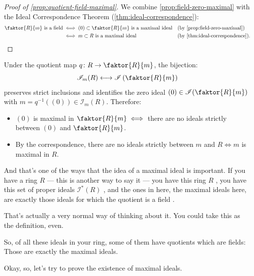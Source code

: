 \begin{content}
\begin{proof}[Proof of \cref{prop:quotient-field-maximal}]
We combine \cref{prop:field-zero-maximal} with the Ideal Correspondence Theorem (\cref{thm:ideal-correspondence}):
\begin{align*}
\faktor{R}{m} \text{ is a field} &\iff (0) \subset \faktor{R}{m} \text{ is a maximal ideal} && (\text{by \cref{prop:field-zero-maximal}}) \\
&\iff m \subset R \text{ is a maximal ideal} && (\text{by \cref{thm:ideal-correspondence}}).
\end{align*}
\end{proof}

\begin{steps}
Under the quotient map $q \colon R \to \faktor{R}{m}$, the bijection:
\[
\mathscr{I}_m(R) \longleftrightarrow \mathscr{I}\left(\faktor{R}{m}\right)
\]
preserves strict inclusions and identifies the zero ideal $(0) \in \mathscr{I}(\faktor{R}{m})$ with $m = q^{-1}((0)) \in \mathscr{I}_m(R)$.
Therefore:
\begin{itemize}
    \item $(0)$ is maximal in $\faktor{R}{m} \iff$ there are no ideals strictly between $(0)$ and $\faktor{R}{m}$.
    \item By the correspondence, there are no ideals strictly between $m$ and $R \iff m$ is maximal in $R$.
\end{itemize}
\end{steps}
\end{content}

\begin{speech}[00:25:02 - 00:26:03]
And that's one of the ways that the idea of a maximal ideal is important. If you have a ring $R$ --- this is another way to say it --- you have this ring $R$ , you have this set of proper ideals $\mathscr{I}^*(R)$ , and the ones in here, the maximal ideals here, are exactly those ideals for which the quotient is a field .

That's actually a very normal way of thinking about it. You could take this as the definition, even.

So, of all these ideals in your ring, some of them have quotients which are fields: Those are exactly the maximal ideals.

Okay, so, let's try to prove the existence of maximal ideals.
\end{speech}

